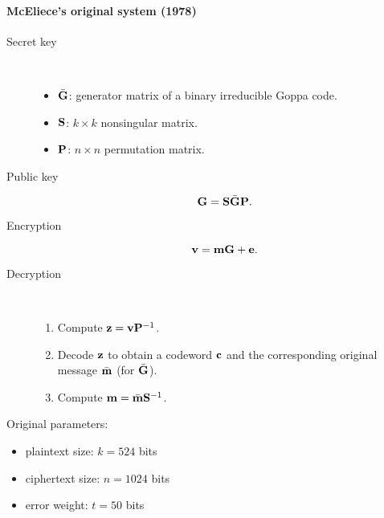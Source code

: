 \documentclass[a4paper, 11pt, openany]{book}
\numberwithin{equation}{section}
\theoremstyle{plain}
\theoremstyle{definition}
\begin{document}
\paragraph{McEliece's original system (1978)}
\begin{description}
\item[Secret key]~
\begin{itemize}
	\item $\bar{\bf G}$: generator matrix of a binary irreducible Goppa code.
	\item ${\bf S}$: $k \times k$ nonsingular matrix.
	\item ${\bf P}$: $n \times n$ permutation matrix.
\end{itemize}

\item[Public key]
\[
    {\bf G} = {\bf S}\bar{\bf G}{\bf P}.
\]

\item[Encryption] 
\[
    {\bf v} = {\bf m}{\bf G} + {\bf e}.
\]

\item[Decryption]~
\begin{enumerate}
	\item Compute ${\bf z} = {\bf v} {\bf P}^{-1}$.
	\item Decode ${\bf z}$ to obtain a codeword ${\bf c}$ and the corresponding original message  $\bar{\bf m}$ (for $\bar{\bf G}$).
	\item Compute ${\bf m} = \bar{\bf m} {\bf S}^{-1}$.
\end{enumerate}
\end{description}

Original parameters:
\begin{itemize}
	\item plaintext size: $k=524$ bits
	
	\item ciphertext size: $n = 1024$ bits

	\item error weight: $t = 50$ bits
%
\end{itemize}








%
%
\end{document}
